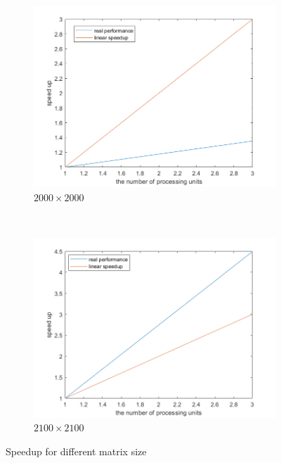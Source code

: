 \documentclass[]{article}
\begin{document}
\begin{figure}
    \centering
    \begin{subfigure}[b]{0.4\textwidth}
        \includegraphics[width=\textwidth]{Figure_speedup_2000.png}
        \caption{$2000\times2000$}
        \label{fig:gull}
    \end{subfigure}
    ~ %
    \begin{subfigure}[b]{0.4\textwidth}
        \includegraphics[width=\textwidth]{Figure_speedup_2100.png}
        \caption{$2100\times 2100$}
        \label{fig:tiger}
    \end{subfigure}
    \caption{Speedup for different matrix size}\label{fig:animals}
\end{figure}
\end{document}
